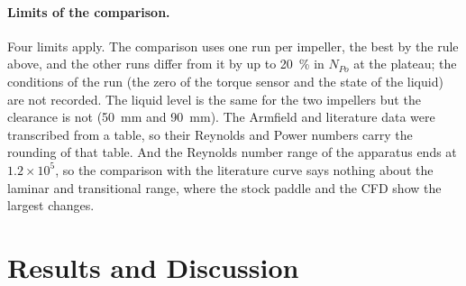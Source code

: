 \begin{table}[htbp]
    \centering
    \caption[The 96 mm data, the CFD and the Armfield data against the literature curve]{Error of the best 96~mm run, the 96~mm CFD, and the Armfield curves against the literature curve (Brown et al., curve~10), interpolated in the logarithms to the Reynolds number of each point. 96~mm run and CFD: $N_{Re}\geq4\times10^{4}$ and, for the CFD, up to the highest experimental value; Armfield: $N_{Re}\geq4000$. Bias is the mean of $(N_{Po} - N_{Po,\mathrm{lit}})/N_{Po,\mathrm{lit}}$.}
    \label{tab:rmse-lit}
    \small
    \resizebox{\textwidth}{!}{}
\end{table}

\paragraph{Limits of the comparison.}
Four limits apply. The comparison uses one run per impeller, the best by the rule above, and the other runs differ from it by up to 20~\% in $N_{Po}$ at the plateau; the conditions of the run (the zero of the torque sensor and the state of the liquid) are not recorded. The liquid level is the same for the two impellers but the clearance is not (50~mm and 90~mm). The Armfield and literature data were transcribed from a table, so their Reynolds and Power numbers carry the rounding of that table. And the Reynolds number range of the apparatus ends at $1.2\times10^{5}$, so the comparison with the literature curve says nothing about the laminar and transitional range, where the stock paddle and the CFD show the largest changes.


\section{Results and Discussion}
\label{sec:agit-discussion}

